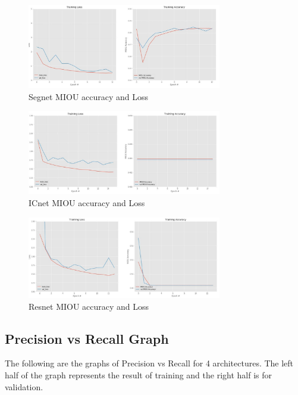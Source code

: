 \documentclass{IEEEtran}
\begin{document}
\begin{figure}[h]
    \centering
    \captionsetup{justification=centering}
    \includegraphics[width=8.5cm]{Segnet-cityscrapes-B16-gr.JPG}
    \caption{Segnet MIOU accuracy and Loss}
    \label{fig:Binary class segmented output}
\end{figure}

\begin{figure}[h]
    \centering
    \captionsetup{justification=centering}
    \includegraphics[width=8.5cm]{ICnet-cityscrapes-B16-gr.JPG}
    \caption{ICnet MIOU accuracy and Loss}
    \label{fig:Binary class segmented output}
\end{figure}

\begin{figure}[h]
    \centering
    \captionsetup{justification=centering}
    \includegraphics[width=8.5cm]{Resnet-cityscrapes-B16-gr.JPG}
    \caption{Resnet MIOU accuracy and Loss}
    \label{fig:Binary class segmented output}
\end{figure}
\newpage

\subsection{\textbf{Precision vs Recall Graph}}
The following are the graphs of Precision vs Recall for 4 architectures. The left half of the graph represents the result of training and the right half is for validation.
\end{document}
